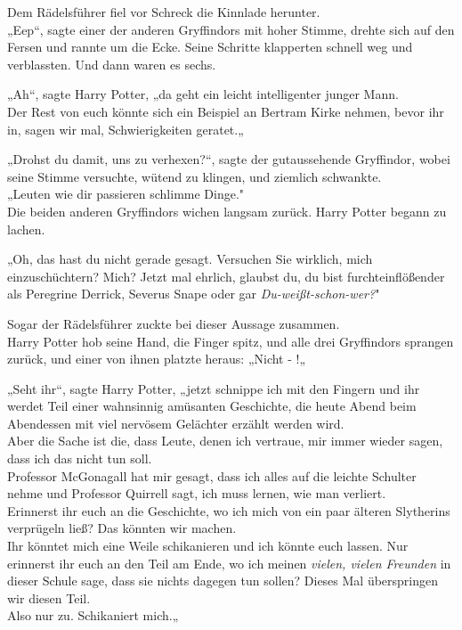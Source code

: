 {Dem Rädelsführer fiel vor Schreck die Kinnlade herunter.\\ „Eep“, sagte einer der anderen Gryffindors mit hoher Stimme, drehte sich auf den Fersen und rannte um die Ecke. Seine Schritte klapperten schnell weg und verblassten. Und dann waren es sechs.

„Ah“, sagte Harry Potter, „da geht ein leicht intelligenter junger Mann.\\ Der Rest von euch könnte sich ein Beispiel an Bertram Kirke nehmen, bevor ihr in, sagen wir mal, Schwierigkeiten geratet.„

„Drohst du damit, uns zu verhexen?“, sagte der gutaussehende Gryffindor, wobei seine Stimme versuchte, wütend zu klingen, und ziemlich schwankte.\\ „Leuten wie dir passieren schlimme Dinge."\\ Die beiden anderen Gryffindors wichen langsam zurück. Harry Potter begann zu lachen.

„Oh, das hast du nicht gerade gesagt. Versuchen Sie wirklich, mich einzuschüchtern? Mich? Jetzt mal ehrlich, glaubst du, du bist furchteinflößender als Peregrine Derrick, Severus Snape oder gar \emph{Du-weißt-schon-wer?}"

Sogar der Rädelsführer zuckte bei dieser Aussage zusammen.\\ Harry Potter hob seine Hand, die Finger spitz, und alle drei Gryffindors sprangen zurück, und einer von ihnen platzte heraus: „Nicht - !„

„Seht ihr“, sagte Harry Potter, „jetzt schnippe ich mit den Fingern und ihr werdet Teil einer wahnsinnig amüsanten Geschichte, die heute Abend beim Abendessen mit viel nervösem Gelächter erzählt werden wird.\\ Aber die Sache ist die, dass Leute, denen ich vertraue, mir immer wieder sagen, dass ich das nicht tun soll.\\ Professor McGonagall hat mir gesagt, dass ich alles auf die leichte Schulter nehme und Professor Quirrell sagt, ich muss lernen, wie man verliert.\\ Erinnerst ihr euch an die Geschichte, wo ich mich von ein paar älteren Slytherins verprügeln ließ? Das könnten wir machen.\\ Ihr könntet mich eine Weile schikanieren und ich könnte euch lassen. Nur erinnerst ihr euch an den Teil am Ende, wo ich meinen \emph{vielen, vielen Freunden} in dieser Schule sage, dass sie nichts dagegen tun sollen? Dieses Mal überspringen wir diesen Teil.\\ Also nur zu. Schikaniert mich.„

}
